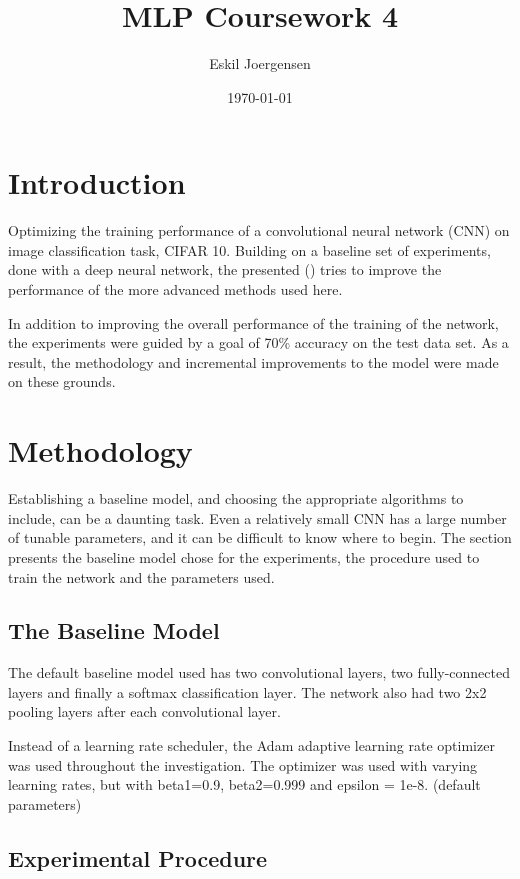 \documentclass[]{article}
\title{MLP Coursework 4}
\author{Eskil Joergensen}
\date{\today}
\begin{document}
\maketitle

\section{Introduction}

Optimizing the training performance of a convolutional neural network (CNN) on image classification task, CIFAR 10. Building on a baseline set of experiments, done with a deep neural network, the presented () tries to improve the performance of the more advanced methods used here. 

In addition to improving the overall performance of the training of the network, the experiments were guided by a goal of 70\% accuracy on the test data set. As a result, the methodology and incremental improvements to the model were made on these grounds. 

\section{Methodology}

Establishing a baseline model, and choosing the appropriate algorithms to include, can be a daunting task. Even a relatively small CNN has a large number of tunable parameters, and it can be difficult to know where to begin. The section presents the baseline model chose for the experiments, the procedure used to train the network and the parameters used. 

\subsection{The Baseline Model}

The default baseline model used has two convolutional layers, two fully-connected layers and finally a softmax classification layer. The network also had two 2x2 pooling layers after each convolutional layer. 

Instead of a learning rate scheduler, the Adam adaptive learning rate optimizer was used throughout the investigation. The optimizer was used with varying learning rates, but with beta1=0.9, beta2=0.999 and epsilon = 1e-8. (default parameters) 

\subsection{Experimental Procedure}
\end{document}
